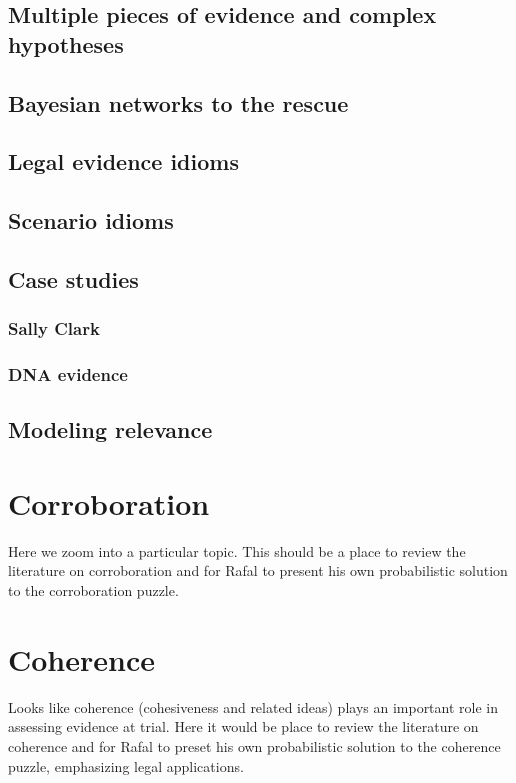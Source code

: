 \documentclass[]{book}
\begin{document}
\section{Multiple pieces of evidence and complex hypotheses}

\section{Bayesian networks to the rescue}

\section{Legal evidence idioms}

\section{Scenario idioms}

\section{Case studies}

\subsection{Sally Clark}

\subsection{DNA evidence}

\section{Modeling relevance}

\chapter{Corroboration}

Here we zoom into a particular topic. This should be a place to review
the literature on corroboration and for Rafal to present his own
probabilistic solution to the corroboration puzzle.

\chapter{Coherence}

Looks like coherence (cohesiveness and related ideas) plays an important
role in assessing evidence at trial. Here it would be place to review
the literature on coherence and for Rafal to preset his own
probabilistic solution to the coherence puzzle, emphasizing legal
applications.
\end{document}
